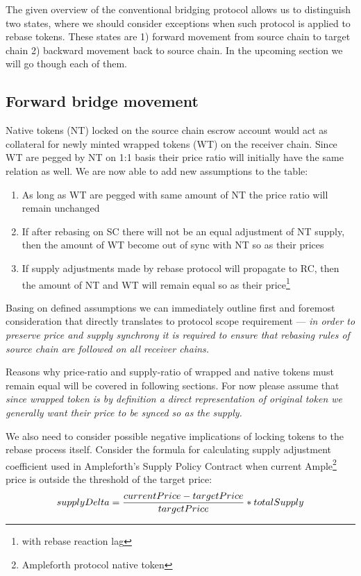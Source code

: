 \documentclass{article}
\begin{document}
The given overview of the conventional bridging protocol allows us to distinguish two states, where we should consider exceptions when such protocol is applied to rebase tokens. These states are 1) forward movement from source chain to target chain 2) backward movement back to source chain. In the upcoming section we will go though each of them.

\subsection{Forward bridge movement}

Native tokens (NT) locked on the source chain escrow account would act as collateral for newly minted wrapped tokens (WT) on the receiver chain. Since WT are pegged by NT on 1:1 basis their price ratio will initially have the same relation as well. We are now able to add new assumptions to the table:

\begin{enumerate}
	\item As long as WT are pegged with same amount of NT the price ratio will remain unchanged
	\item If after rebasing on SC there will not be an equal adjustment of NT supply, then the amount of WT become out of sync with NT so as their prices
	\item If supply adjustments made by rebase protocol will propagate to RC, then the amount of NT and WT will remain equal so as their price\footnote{with rebase reaction lag}
\end{enumerate}

Basing on defined assumptions we can immediately outline first and foremost consideration that directly translates to protocol scope requirement --- \textit{in order to preserve price and supply synchrony it is required to ensure that rebasing rules of source chain are followed on all receiver chains.}

Reasons why price-ratio and supply-ratio of wrapped and native tokens must remain equal will be covered in following sections. For now please assume that \textit{since wrapped token is by definition a direct representation of original token we generally want their price to be synced so as the supply.}

We also need to consider possible negative implications of locking tokens to the rebase process itself. Consider the formula for calculating supply adjustment coefficient used in Ampleforth's Supply Policy Contract \cite{kuo2019ampleforth} when current Ample\footnote{Ampleforth protocol native token} price is outside the threshold of the target price:
\[supplyDelta = \frac{currentPrice-targetPrice}{targetPrice}\ast\\totalSupply\]
\end{document}
